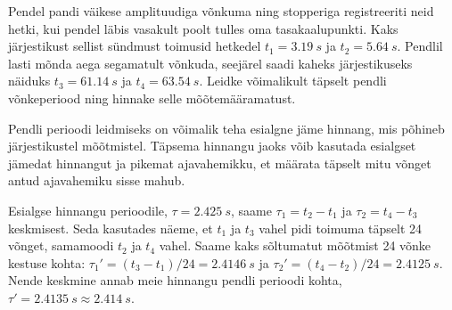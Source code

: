 
Pendel pandi väikese amplituudiga võnkuma ning stopperiga registreeriti neid hetki, kui pendel läbis vasakult poolt tulles oma tasakaalupunkti. Kaks järjestikust sellist sündmust toimusid hetkedel $t_1=\SI{3,19}{s}$ ja $t_2=\SI{5,64}{s}$. Pendlil lasti mõnda aega segamatult võnkuda, seejärel saadi kaheks järjestikuseks näiduks $t_3=\SI{61,14}{s}$ ja $t_4=\SI{63,54}{s}$. Leidke võimalikult täpselt pendli võnkeperiood ning hinnake selle mõõtemääramatust.

\hint
Pendli perioodi leidmiseks on võimalik teha esialgne jäme hinnang, mis põhineb järjestikustel mõõtmistel. Täpsema hinnangu jaoks võib kasutada esialgset jämedat hinnangut ja pikemat ajavahemikku, et määrata täpselt mitu võnget antud ajavahemiku sisse mahub.

\solu
Esialgse hinnangu perioodile, $\tau = \SI{2,425}{s}$, saame $\tau_1 = t_2 - t_1$ ja $\tau_2 = t_4 - t_3$
keskmisest. Seda kasutades näeme, et $t_1$ ja $t_3$ vahel pidi toimuma täpselt \num{24} võnget,
samamoodi $t_2$ ja $t_4$ vahel. Saame kaks sõltumatut mõõtmist \num{24} võnke kestuse kohta:
$\tau_1' = (t_3-t_1)/\num{24} = \SI{2,4146}{s}$ ja $\tau_2'= (t_4-t_2)/\num{24} = \SI{2,4125}{s}$. Nende keskmine annab
meie hinnangu pendli perioodi kohta, $\tau' = \SI{2,4135}{s} \approx \SI{2,414}{s}$.
\probend